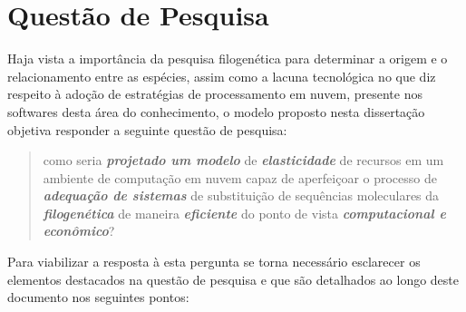 \documentclass[english,brazilian]{UNISINOSmonografia} %
\begin{document}
\section{Questão de Pesquisa} %


Haja vista a importância da pesquisa filogenética para determinar a origem e o relacionamento entre as espécies, assim como a lacuna tecnológica no que diz respeito à adoção de estratégias de processamento em nuvem, presente nos softwares desta área do conhecimento, o modelo proposto nesta dissertação objetiva responder a seguinte questão de pesquisa:


\begin{quote}
	\large
	como seria \textbf{\textit{projetado um modelo}} de \textbf{\textit{elasticidade}} de recursos em um ambiente de computação em nuvem capaz de aperfeiçoar o processo de \textbf{\textit{adequação de sistemas}} de substituição de sequências moleculares da \textbf{\textit{filogenética}} de maneira \textbf{\textit{eficiente}} do ponto de vista \textbf{\textit{computacional e econômico}}?
	
\end{quote}


Para viabilizar a resposta à esta pergunta se torna necessário esclarecer os elementos destacados na questão de pesquisa e que são detalhados ao longo deste documento nos seguintes pontos:
\end{document}
